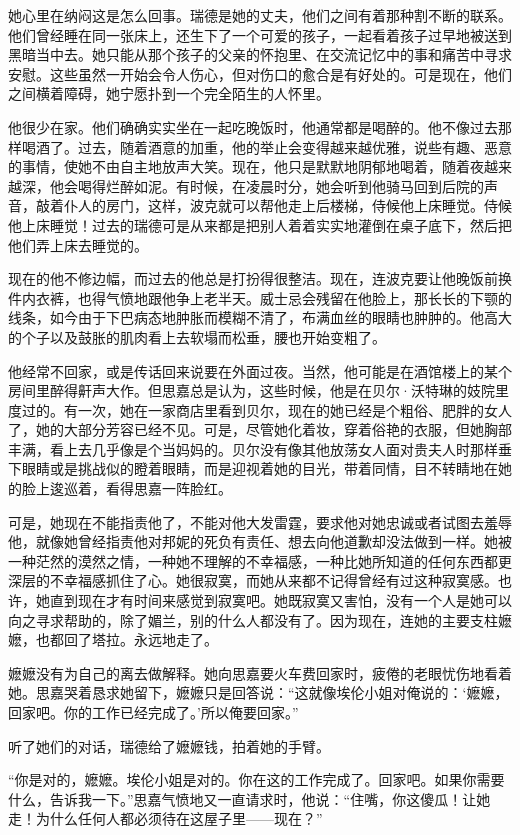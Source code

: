 \par 她心里在纳闷这是怎么回事。瑞德是她的丈夫，他们之间有着那种割不断的联系。他们曾经睡在同一张床上，还生下了一个可爱的孩子，一起看着孩子过早地被送到黑暗当中去。她只能从那个孩子的父亲的怀抱里、在交流记忆中的事和痛苦中寻求安慰。这些虽然一开始会令人伤心，但对伤口的愈合是有好处的。可是现在，他们之间横着障碍，她宁愿扑到一个完全陌生的人怀里。
\par 他很少在家。他们确确实实坐在一起吃晚饭时，他通常都是喝醉的。他不像过去那样喝酒了。过去，随着酒意的加重，他的举止会变得越来越优雅，说些有趣、恶意的事情，使她不由自主地放声大笑。现在，他只是默默地阴郁地喝着，随着夜越来越深，他会喝得烂醉如泥。有时候，在凌晨时分，她会听到他骑马回到后院的声音，敲着仆人的房门，这样，波克就可以帮他走上后楼梯，侍候他上床睡觉。侍候他上床睡觉！过去的瑞德可是从来都是把别人着着实实地灌倒在桌子底下，然后把他们弄上床去睡觉的。
\par 现在的他不修边幅，而过去的他总是打扮得很整洁。现在，连波克要让他晚饭前换件内衣裤，也得气愤地跟他争上老半天。威士忌会残留在他脸上，那长长的下颚的线条，如今由于下巴病态地肿胀而模糊不清了，布满血丝的眼睛也肿肿的。他高大的个子以及鼓胀的肌肉看上去软塌而松垂，腰也开始变粗了。
\par 他经常不回家，或是传话回来说要在外面过夜。当然，他可能是在酒馆楼上的某个房间里醉得鼾声大作。但思嘉总是认为，这些时候，他是在贝尔·沃特琳的妓院里度过的。有一次，她在一家商店里看到贝尔，现在的她已经是个粗俗、肥胖的女人了，她的大部分芳容已经不见。可是，尽管她化着妆，穿着俗艳的衣服，但她胸部丰满，看上去几乎像是个当妈妈的。贝尔没有像其他放荡女人面对贵夫人时那样垂下眼睛或是挑战似的瞪着眼睛，而是迎视着她的目光，带着同情，目不转睛地在她的脸上逡巡着，看得思嘉一阵脸红。
\par 可是，她现在不能指责他了，不能对他大发雷霆，要求他对她忠诚或者试图去羞辱他，就像她曾经指责他对邦妮的死负有责任、想去向他道歉却没法做到一样。她被一种茫然的漠然之情，一种她不理解的不幸福感，一种比她所知道的任何东西都更深层的不幸福感抓住了心。她很寂寞，而她从来都不记得曾经有过这种寂寞感。也许，她直到现在才有时间来感觉到寂寞吧。她既寂寞又害怕，没有一个人是她可以向之寻求帮助的，除了媚兰，别的什么人都没有了。因为现在，连她的主要支柱嬷嬷，也都回了塔拉。永远地走了。
\par 嬷嬷没有为自己的离去做解释。她向思嘉要火车费回家时，疲倦的老眼忧伤地看着她。思嘉哭着恳求她留下，嬷嬷只是回答说：“这就像埃伦小姐对俺说的：‘嬷嬷，回家吧。你的工作已经完成了。’所以俺要回家。”
\par 听了她们的对话，瑞德给了嬷嬷钱，拍着她的手臂。
\par “你是对的，嬷嬷。埃伦小姐是对的。你在这的工作完成了。回家吧。如果你需要什么，告诉我一下。”思嘉气愤地又一直请求时，他说：“住嘴，你这傻瓜！让她走！为什么任何人都必须待在这屋子里——现在？”
